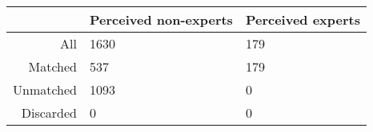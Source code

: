 \begin{table}[ht]
\centering
\begin{tabular}{rll}
  \hline
 & Perceived non-experts & Perceived experts \\ 
  \hline
All & 1630 & 179 \\ 
  Matched & 537 & 179 \\ 
  Unmatched & 1093 & 0 \\ 
  Discarded & 0 & 0 \\ 
   \hline
\end{tabular}
\end{table}

